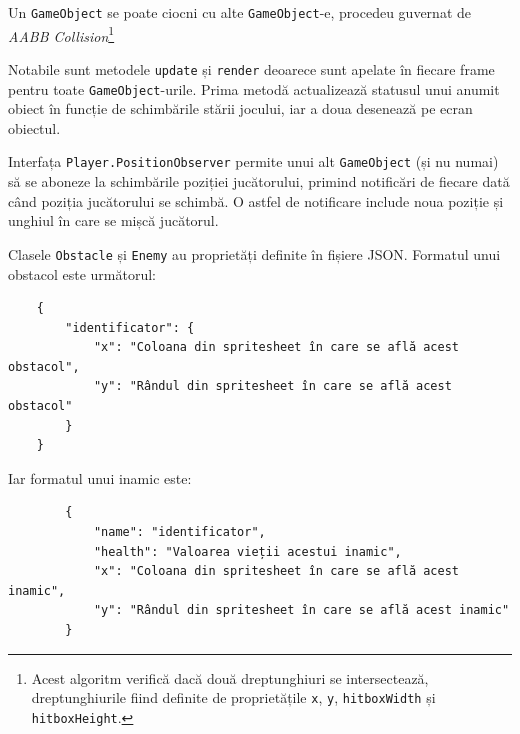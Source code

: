 \documentclass{article}
\begin{document}
    Un \texttt{GameObject} se poate ciocni cu alte \texttt{GameObject}-e, procedeu guvernat de
    \emph{AABB Collision}\footnote{Acest algoritm verifică dacă două dreptunghiuri se intersectează,
    dreptunghiurile fiind definite de proprietățile \texttt{x}, \texttt{y}, \texttt{hitboxWidth} și
    \texttt{hitboxHeight}.}

    Notabile sunt metodele \texttt{update} și \texttt{render} deoarece sunt apelate în fiecare frame
    pentru toate \texttt{GameObject}-urile. Prima metodă actualizează statusul unui anumit obiect în
    funcție de schimbările stării jocului, iar a doua desenează pe ecran obiectul.

    Interfața \texttt{Player.PositionObserver} permite unui alt \texttt{GameObject} (și nu numai) să
    se aboneze la schimbările poziției jucătorului, primind notificări de fiecare dată când poziția
    jucătorului se schimbă. O astfel de notificare include noua poziție și unghiul în care se mișcă
    jucătorul.

    Clasele \texttt{Obstacle} și \texttt{Enemy} au proprietăți definite în fișiere JSON. Formatul
    unui obstacol este următorul:

    \begin{verbatim}
    {
        "identificator": {
            "x": "Coloana din spritesheet în care se află acest obstacol",
            "y": "Rândul din spritesheet în care se află acest obstacol"
        }
    }
    \end{verbatim}

    Iar formatul unui inamic este:
    \begin{verbatim}
        {
            "name": "identificator",
            "health": "Valoarea vieții acestui inamic",
            "x": "Coloana din spritesheet în care se află acest inamic",
            "y": "Rândul din spritesheet în care se află acest inamic"
        }
    \end{verbatim}
\end{document}

